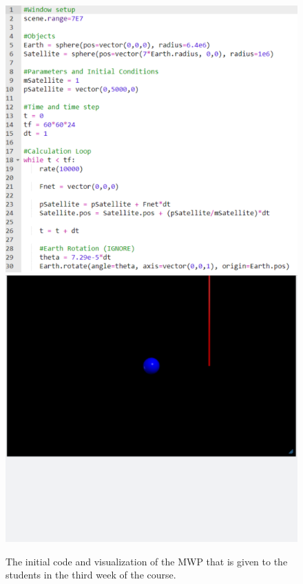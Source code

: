 \documentclass{msuphddissertation}
\begin{document}
\begin{doublespace}
\begin{figure}[ht]\centering
\includegraphics[scale=0.40]{images/CH3InitialCode.pdf}\includegraphics[scale=0.40]{images/CH3InitialVisual.pdf}
\caption{The initial code and visualization of the MWP that is given to the students in the third week of the course.}\label{CH3:InitialCodeVisual}
\end{figure}


\end{doublespace}
\end{document}
